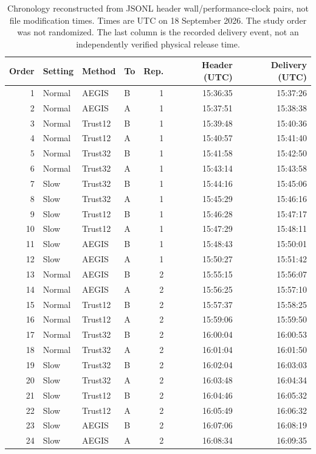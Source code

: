 \begin{table}[H]
\centering
\small
\caption{Chronology reconstructed from JSONL header wall/performance-clock pairs, not file modification times. Times are UTC on 18 September 2026. The study order was not randomized. The last column is the recorded delivery event, not an independently verified physical release time.}
\label{tab:run-chronology}
\begin{tabular}{rlllrrr}
\toprule
Order & Setting & Method & To & Rep. & Header (UTC) & Delivery (UTC) \\
\midrule
1 & Normal & AEGIS & B & 1 & 15:36:35 & 15:37:26 \\
2 & Normal & AEGIS & A & 1 & 15:37:51 & 15:38:38 \\
3 & Normal & Trust12 & B & 1 & 15:39:48 & 15:40:36 \\
4 & Normal & Trust12 & A & 1 & 15:40:57 & 15:41:40 \\
5 & Normal & Trust32 & B & 1 & 15:41:58 & 15:42:50 \\
6 & Normal & Trust32 & A & 1 & 15:43:14 & 15:43:58 \\
7 & Slow & Trust32 & B & 1 & 15:44:16 & 15:45:06 \\
8 & Slow & Trust32 & A & 1 & 15:45:29 & 15:46:16 \\
9 & Slow & Trust12 & B & 1 & 15:46:28 & 15:47:17 \\
10 & Slow & Trust12 & A & 1 & 15:47:29 & 15:48:11 \\
11 & Slow & AEGIS & B & 1 & 15:48:43 & 15:50:01 \\
12 & Slow & AEGIS & A & 1 & 15:50:27 & 15:51:42 \\
13 & Normal & AEGIS & B & 2 & 15:55:15 & 15:56:07 \\
14 & Normal & AEGIS & A & 2 & 15:56:25 & 15:57:10 \\
15 & Normal & Trust12 & B & 2 & 15:57:37 & 15:58:25 \\
16 & Normal & Trust12 & A & 2 & 15:59:06 & 15:59:50 \\
17 & Normal & Trust32 & B & 2 & 16:00:04 & 16:00:53 \\
18 & Normal & Trust32 & A & 2 & 16:01:04 & 16:01:50 \\
19 & Slow & Trust32 & B & 2 & 16:02:04 & 16:03:03 \\
20 & Slow & Trust32 & A & 2 & 16:03:48 & 16:04:34 \\
21 & Slow & Trust12 & B & 2 & 16:04:46 & 16:05:32 \\
22 & Slow & Trust12 & A & 2 & 16:05:49 & 16:06:32 \\
23 & Slow & AEGIS & B & 2 & 16:07:06 & 16:08:19 \\
24 & Slow & AEGIS & A & 2 & 16:08:34 & 16:09:35 \\
\bottomrule
\end{tabular}
\end{table}
